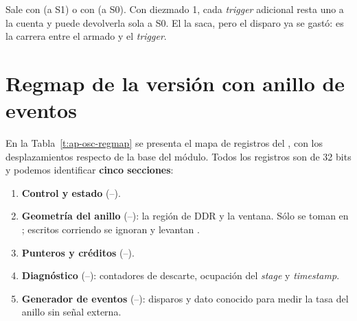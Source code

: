 Sale con  (a S1) o con  (a S0). Con diezmado 1, cada
\emph{trigger} adicional resta uno a la cuenta y puede devolverla sola a S0. El
 la saca, pero el disparo ya se gastó: es la carrera entre el armado
y el \emph{trigger}.

\section{Regmap de la versión con anillo de eventos}
\label{S:ap-osc-regmap}

En la Tabla~\ref{t:ap-osc-regmap} se presenta el mapa de registros del
, con los desplazamientos respecto de la base del
módulo. Todos los registros son de 32 bits y podemos identificar
\textbf{cinco secciones}:
\begin{enumerate}
  \item \textbf{Control y estado} (--).
  \item \textbf{Geometría del anillo} (--): la región
    de DDR y la ventana. Sólo se toman en ; escritos corriendo
    se ignoran y levantan .
  \item \textbf{Punteros y créditos} (--).
  \item \textbf{Diagnóstico} (--): contadores de
    descarte, ocupación del \emph{stage} y \emph{timestamp}.
  \item \textbf{Generador de eventos} (--):
    disparos y dato conocido para medir la tasa del anillo sin señal externa.
\end{enumerate}


